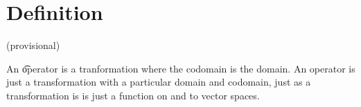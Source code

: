 
\section*{Definition}

(provisional)

An \t{operator} is a tranformation where the codomain is the domain.
An operator is just a transformation with a particular domain and codomain, just as a transformation is is just a function on and to vector spaces.

\blankpage

